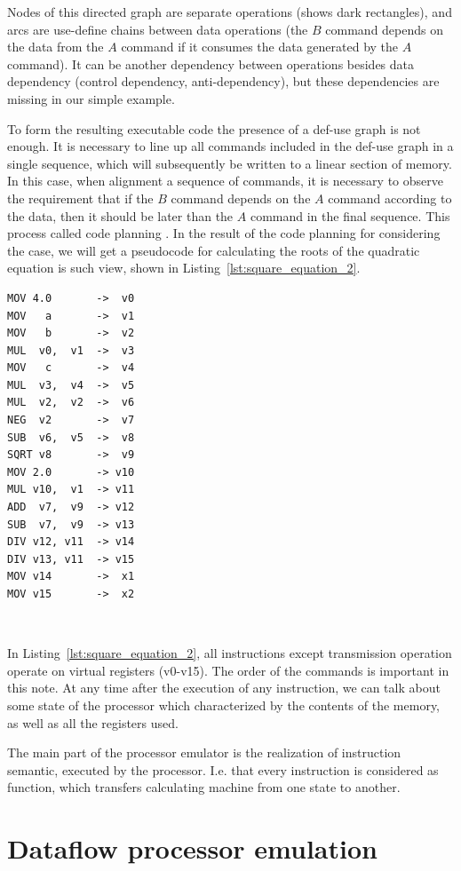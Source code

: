 \documentclass[
11pt,%
tightenlines,%
twoside,%
onecolumn,%
nofloats,%
nobibnotes,%
nofootinbib,%
superscriptaddress,%
noshowpacs,%
centertags]%
{revtex4}
\begin{document}
Nodes of this directed graph are separate operations (shows dark rectangles), and arcs are use-define chains between data operations (the $B$ command depends on the data from the $A$ command if it consumes the data generated by the $A$ command).
It can be another dependency between operations besides data dependency (control dependency, anti-dependency), but these dependencies are missing in our simple example.

To form the resulting executable code the presence of a def-use graph is not enough.
It is necessary to line up all commands included in the def-use graph in a single sequence, which will subsequently be written to a linear section of memory.
In this case, when alignment a sequence of commands, it is necessary to observe the requirement that if the $B$ command depends on the $A$ command according to the data, then it should be later than the $A$ command in the final sequence.
This process called code planning \cite{Aho}.
In the result of the code planning for considering the case, we will get a pseudocode for calculating the roots of the quadratic equation is such view, shown in Listing~\ref{lst:square_equation_2}.

\begin{lstlisting}[caption={Pseudocode for calculating the roots of a quadratic equation.},label={lst:square_equation_2}]
MOV 4.0       ->  v0
MOV   a       ->  v1
MOV   b       ->  v2
MUL  v0,  v1  ->  v3
MOV   c       ->  v4
MUL  v3,  v4  ->  v5
MUL  v2,  v2  ->  v6
NEG  v2       ->  v7
SUB  v6,  v5  ->  v8
SQRT v8       ->  v9
MOV 2.0       -> v10
MUL v10,  v1  -> v11
ADD  v7,  v9  -> v12
SUB  v7,  v9  -> v13
DIV v12, v11  -> v14
DIV v13, v11  -> v15
MOV v14       ->  x1
MOV v15       ->  x2
\end{lstlisting}

\

In Listing~\ref{lst:square_equation_2}, all instructions except transmission operation operate on virtual registers (v0-v15).
The order of the commands is important in this note.
At any time after the execution of any instruction, we can talk about some state of the processor which characterized by the contents of the memory, as well as all the registers used.

The main part of the processor emulator is the realization of instruction semantic, executed by the processor.
I.e. that every instruction is considered as function, which transfers calculating machine from one state to another.

\section{Dataflow processor emulation}
\end{document}
